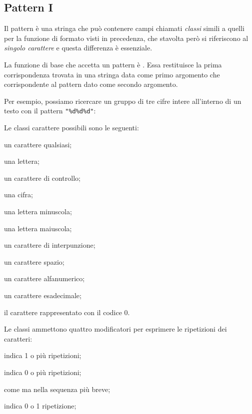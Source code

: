 \subsection{Pattern I}
\label{secFondPattern}

Il pattern è una stringa che può contenere campi chiamati \emph{classi} simili
a quelli per la funzione di formato visti in precedenza, che stavolta però si
riferiscono al \emph{singolo carattere} e questa differenza è essenziale.

La funzione di base che accetta un pattern è
. Essa restituisce la prima corrispondenza
trovata in una stringa data come primo argomento che corrispondente al pattern
dato come secondo argomento.

Per esempio, possiamo ricercare un gruppo di tre cifre intere all'interno di un
testo con il pattern \verb|"%d%d%d"|:

Le classi carattere possibili sono le seguenti:
\begin{compactdescription}
  \item[\key{.}] un carattere qualsiasi;
  \item[\key{\%a}] una lettera;
  \item[\key{\%c}] un carattere di controllo;
  \item[\key{\%d}] una cifra;
  \item[\key{\%l}] una lettera minuscola;
  \item[\key{\%u}] una lettera maiuscola;
  \item[\key{\%p}] un carattere di interpunzione;
  \item[\key{\%s}] un carattere spazio;
  \item[\key{\%w}] un carattere alfanumerico;
  \item[\key{\%x}] un carattere esadecimale;
  \item[\key{\%z}] il carattere rappresentato con il codice 0.
\end{compactdescription}

Le classi ammettono quattro modificatori per esprimere le ripetizioni dei
caratteri:
\begin{compactdescription}
  \item[\key{+}] indica 1 o più ripetizioni;
  \item[\key{*}] indica 0 o più ripetizioni;
  \item[\key{-}] come \key{*} ma nella sequenza più breve;
  \item[\key{?}] indica 0 o 1 ripetizione;
\end{compactdescription}


